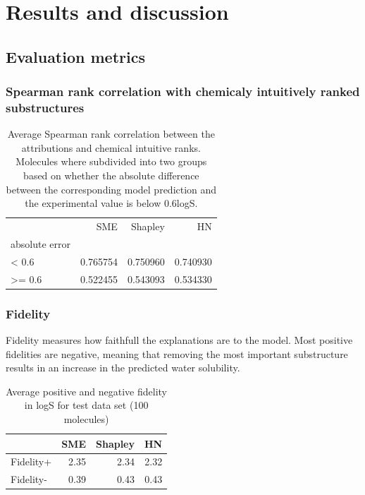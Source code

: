 \documentclass[twoside,twocolumn,9pt]{article}
\begin{document}
\newpage
\section{Results and discussion}


\subsection{Evaluation metrics}

\subsubsection{Spearman rank correlation with chemicaly intuitively ranked substructures}

\begin{center}
\begin{table}[H]
    \caption{Average Spearman rank correlation between the attributions and chemical intuitive ranks. Molecules where 
        subdivided into two groups based on whether the absolute difference between the corresponding model prediction 
        and the experimental value is below $0.6$logS.
    }
\begin{tabular}{lrrr}
\toprule
 & SME  & Shapley  & HN  \\
absolute error &  &  &  \\
\midrule
< 0.6 & 0.765754 & 0.750960 & 0.740930 \\
>= 0.6 & 0.522455 & 0.543093 & 0.534330 \\
 \bottomrule
\end{tabular}
\end{table}
\end{center}




\subsubsection{Fidelity}

Fidelity measures how faithfull the explanations are to the model. 
Most positive fidelities are negative, meaning that removing the most important 
substructure results in an increase in the predicted water solubility.

\begin{center}
    \begin{table}[H]
        \caption{Average positive and negative fidelity in logS for test data set (100 molecules)}
\begin{tabular}{lrrr}
\toprule
 & SME & Shapley  & HN \\
\midrule
Fidelity+ & 2.35 & 2.34 & 2.32 \\
Fidelity- & 0.39 & 0.43 & 0.43 \\
 \bottomrule
\end{tabular}
\end{table}
\end{center}
\end{document}
